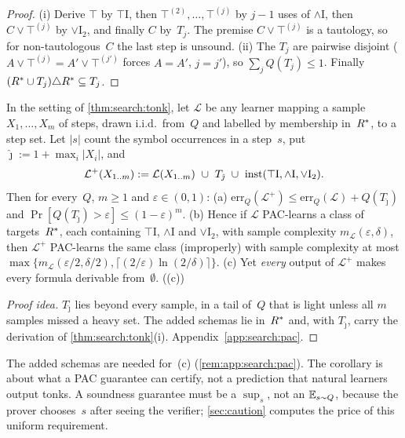 \begin{proof}
(i) Derive $\top$ by $\top$I, then $\top^{(2)},\dots,\top^{(j)}$ by $j-1$ uses of $\wedge$I, then $C\vee\top^{(j)}$ by $\vee$I$_2$, and finally $C$ by~$T_j$. The premise $C\vee\top^{(j)}$ is a tautology, so for non-tautologous~$C$ the last step is unsound.
(ii) The $T_j$ are pairwise disjoint ($A\vee\top^{(j)}=A'\vee\top^{(j')}$ forces $A=A'$, $j=j'$), so $\sum_jQ(T_j)\le1$. Finally $(R^{*}\cup T_j)\triangle R^{*}\subseteq T_j$.
\end{proof}

\begin{corollary}\label{cor:search:pac}
In the setting of \cref{thm:search:tonk}, let $\mathcal L$ be any learner mapping a sample $X_1,\dots,X_m$ of steps, drawn i.i.d.\ from~$Q$ and labelled by membership in~$R^{*}$, to a step set. Let $|s|$ count the symbol occurrences in a step~$s$, put $\hat\jmath:=1+\max_i|X_i|$, and
\[
\mathcal L^+(X_{1..m}):=\mathcal L(X_{1..m})\ \cup\ T_{\hat\jmath}\ \cup\ \inst(\top\mathrm{I},\wedge\mathrm{I},\vee\mathrm{I}_2).
\]
Then for every~$Q$, $m\ge1$ and $\varepsilon\in(0,1)$: (a) $\mathrm{err}_Q(\mathcal L^+)\le\mathrm{err}_Q(\mathcal L)+Q(T_{\hat\jmath})$ and $\Pr[Q(T_{\hat\jmath})>\varepsilon]\le(1-\varepsilon)^m$. (b) Hence if $\mathcal L$ PAC-learns a class of targets~$R^{*}$, each containing $\top$I, $\wedge$I and $\vee$I$_2$, with sample complexity $m_{\mathcal L}(\varepsilon,\delta)$, then $\mathcal L^+$ PAC-learns the same class (improperly) with sample complexity at most $\max\{m_{\mathcal L}(\varepsilon/2,\delta/2),\lceil(2/\varepsilon)\ln(2/\delta)\rceil\}$. (c) Yet \emph{every} output of $\mathcal L^+$ makes every formula derivable from~$\emptyset$.
\hspace*{\fill}\allowbreak\hspace*{\fill} ((c))
\end{corollary}

\begin{proof}[Proof idea]
$T_{\hat\jmath}$ lies beyond every sample, in a tail of~$Q$ that is light unless all $m$ samples missed a heavy set. The added schemas lie in~$R^{*}$ and, with $T_{\hat\jmath}$, carry the derivation of \cref{thm:search:tonk}(i). Appendix~\ref{app:search:pac}.
\end{proof}

The added schemas are needed for~(c) (\cref{rem:app:search:pac}). The corollary is about what a PAC guarantee can certify, not a prediction that natural learners output tonks. A soundness guarantee must be a $\sup_s$, not an $\mathbb{E}_{s\sim Q}$, because the prover chooses~$s$ after seeing the verifier; \cref{sec:caution} computes the price of this uniform requirement.

